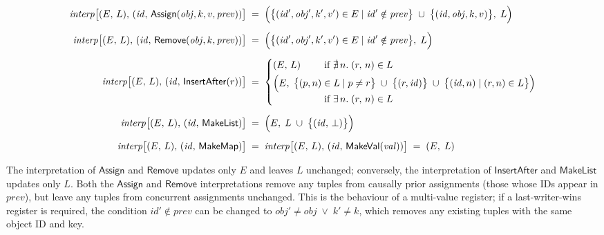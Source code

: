\begin{align*}
    \mathit{interp}\big[(E,\, L),\, (\mathit{id},\, \mathsf{Assign}(\mathit{obj}, k, v, \mathit{prev})) \big] &\;=\; \Big(
    \big\{ (\mathit{id}', \mathit{obj}', k', v') \in E \mid
    \mathit{id}' \notin \mathit{prev} \big\} \;\cup\;
    \big\{ (\mathit{id}, \mathit{obj}, k, v) \big\},\; L \Big) \\[5pt]
    \mathit{interp}\big[(E,\, L),\, (\mathit{id},\, \mathsf{Remove}(\mathit{obj}, k, \mathit{prev})) \big] &\;=\; \Big(
    \big\{ (\mathit{id}', \mathit{obj}', k', v') \in E \mid
    \mathit{id}' \notin \mathit{prev} \big\},\; L \Big) \\[5pt]
    \mathit{interp}\big[(E,\, L),\, (\mathit{id},\, \mathsf{InsertAfter}(r)) \big] &\;=\; \left\{
        \arraycolsep=0pt \def\arraystretch{1.2}
        \begin{array}{ll}
            (E,\, L) & \text{if } \nexists\,n.\; (r,\, n) \in L\\[3pt]
            \Big(E,\; \big\{ (p,n) \;&\in L \mid p \neq r \big\} \;\cup\;
            \big\{ (r, \mathit{id}) \big\} \;\cup\;
            \big\{ (\mathit{id}, n) \mid (r, n) \in L \big\} \Big)\\
            & \text{if } \exists\,n.\; (r,\,n) \in L
        \end{array} \right. \\[5pt]
    \mathit{interp}\big[(E,\, L),\, (\mathit{id},\, \mathsf{MakeList}) \big] &\;=\; \Big(
    E,\; L \;\cup\; \big\{(\mathit{id},\, \bot)\big\}\Big) \\[5pt]
    \mathit{interp}\big[(E,\, L),\, (\mathit{id},\, \mathsf{MakeMap}) \big] &\;=\; \mathit{interp}\big[(E,\, L),\, (\mathit{id},\, \mathsf{MakeVal}(\mathit{val})) \big] \;=\; (E,\; L)
\end{align*}

The interpretation of $\mathsf{Assign}$ and $\mathsf{Remove}$ updates only $E$ and leaves $L$ unchanged; conversely, the interpretation of $\mathsf{InsertAfter}$ and $\mathsf{MakeList}$ updates only $L$.
Both the $\mathsf{Assign}$ and $\mathsf{Remove}$ interpretations remove any tuples from causally prior assignments (those whose IDs appear in $\mathit{prev}$), but leave any tuples from concurrent assignments unchanged.
This is the behaviour of a multi-value register; if a last-writer-wins register is required, the condition $\mathit{id}' \notin \mathit{prev}$ can be changed to $\mathit{obj}' \neq \mathit{obj} \;\vee\; k' \neq k$, which removes any existing tuples with the same object ID and key.

